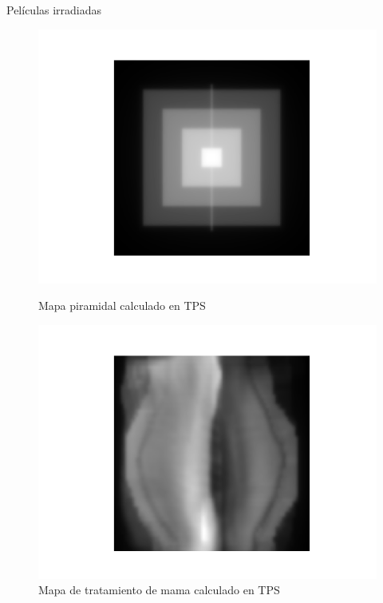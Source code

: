\documentclass[12pt]{beamer}
\begin{document}
\begin{frame}{Películas irradiadas}
\begin{figure}[htp]%
	\centering
	\begin{minipage}{0.45\textwidth}
		\includegraphics[width=\textwidth]{images/piramideTPS.png}
		\caption{Mapa piramidal calculado en TPS}
	\end{minipage}\hfill
	\begin{minipage}{0.45\textwidth}
		\includegraphics[width=\textwidth]{images/mamaTPS.png}
		\caption{Mapa de tratamiento de mama calculado en TPS}
	\end{minipage}\par
	\begin{minipage}{0.4\textwidth}

\end{minipage}
\end{figure}
\end{frame}
\end{document}
